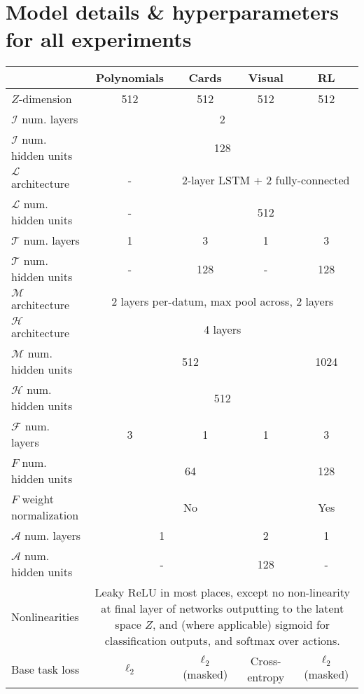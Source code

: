 \chapter{Model details \& hyperparameters for all experiments} \label{appendix:model_hyperparameters}
\begin{table}
\scriptsize
\centering
\begin{tabular}{|p{4cm}||c|c|c|c|}
\hline
& Polynomials & Cards & Visual & RL \\\hline
\hline
$Z$-dimension & 512 & 512 & 512 & 512 \\\hline
$\mathcal{I}$ num. layers & \multicolumn{4}{c|}{2} \\\hline
$\mathcal{I}$ num. hidden units & \multicolumn{4}{c|}{128} \\\hline
$\mathcal{L}$ architecture & -  & \multicolumn{3}{c|}{2-layer LSTM + 2 fully-connected} \\\hline
$\mathcal{L}$ num. hidden units & -  & \multicolumn{3}{c|}{512} \\\hline
$\mathcal{T}$ num. layers & 1 & 3 & 1 & 3 \\\hline
$\mathcal{T}$ num. hidden units & - & 128 & - & 128 \\\hline
$\mathcal{M}$ architecture & \multicolumn{4}{c|}{2 layers per-datum, max pool across, 2 layers} \\\hline
$\mathcal{H}$ architecture & \multicolumn{4}{c|}{4 layers} \\\hline
$\mathcal{M}$ num. hidden units & \multicolumn{3}{c|}{512} & 1024 \\\hline
$\mathcal{H}$ num. hidden units & \multicolumn{4}{c|}{512} \\\hline
$\mathcal{F}$ num. layers & 3 & 1 & 1 & 3 \\\hline
$F$ num. hidden units & \multicolumn{3}{c|}{64} & 128 \\\hline
$F$ weight normalization \citep{Salimans2016} & \multicolumn{3}{c|}{No} & Yes \\\hline
$\mathcal{A}$ num. layers & \multicolumn{2}{c|}{1} & 2 & 1 \\\hline
$\mathcal{A}$ num. hidden units & \multicolumn{2}{c|}{-} & 128 & -  \\\hline
Nonlinearities & \multicolumn{4}{p{11cm}|}{Leaky ReLU in most places, except no non-linearity at final layer of networks outputting to the latent space $Z$, and (where applicable) sigmoid for classification outputs, and softmax over actions.} \\\hline
Base task loss & $\ell_2$ & $\ell_2$ (masked) & Cross-entropy & $\ell_2$ (masked)\\\hline

\end{tabular}
\end{table}
